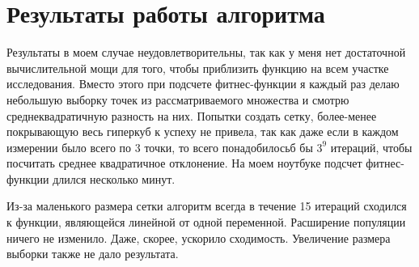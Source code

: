 \documentclass[a4paper]{article}
\begin{document}
\section{Результаты работы алгоритма}

Результаты в моем случае неудовлетворительны, так как у меня нет достаточной вычислительной мощи для того, чтобы приблизить функцию на всем участке исследования. Вместо этого при подсчете фитнес-функции я каждый раз делаю небольшую выборку точек из рассматриваемого множества и смотрю среднеквадратичную разность на них. Попытки создать сетку, более-менее покрывающую весь гиперкуб к успеху не привела, так как даже если в каждом измерении было всего по $3$ точки, то всего понадобилосьб бы $3^9$ итераций, чтобы посчитать среднее квадратичное отклонение. На моем ноутбуке подсчет фитнес-функции длился несколько минут.

Из-за маленького размера сетки алгоритм всегда в течение 15 итераций сходился к функции, являющейся линейной от одной переменной. Расширение популяции ничего не изменило. Даже, скорее, ускорило сходимость. Увеличение размера выборки также не дало результата.
\end{document}
